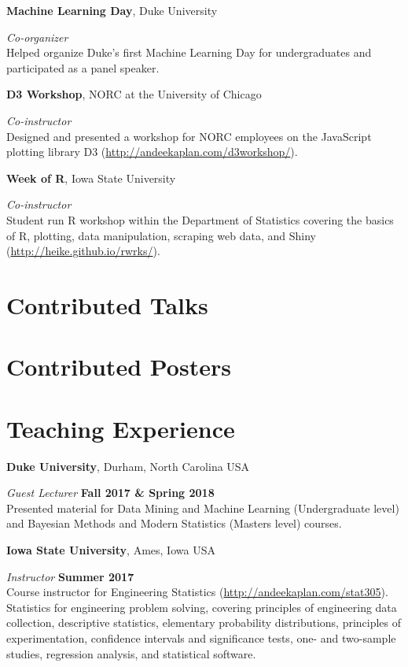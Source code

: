 \documentclass[margin,line]{res}
\begin{document}
\begin{resume}
{\bf Machine Learning Day}, Duke University

\vspace{-.3cm}
{\em Co-organizer} \hfill \\
Helped organize Duke's first Machine Learning Day for undergraduates and participated as a panel speaker.

{\bf D3 Workshop}, NORC at the University of Chicago

\vspace{-.3cm}
{\em Co-instructor} \hfill \\
Designed and presented a workshop for NORC employees on the JavaScript plotting library D3 (\url{http://andeekaplan.com/d3workshop/}).

{\bf Week of R}, Iowa State University

\vspace{-.3cm}
{\em Co-instructor} \hfill \\
Student run R workshop within the Department of Statistics covering the basics of R, plotting, data manipulation, scraping web data, and Shiny (\url{http://heike.github.io/rwrks/}).


\section{\sc Contributed Talks}
\printbibliography[keyword=talk-contributed, heading=none, resetnumbers=true]

\section{\sc Contributed Posters}
\printbibliography[keyword=poster, heading=none, resetnumbers=true]

\section{\sc Teaching Experience}
{\bf Duke University}, Durham, North Carolina USA

{\em Guest Lecturer} \hfill {\bf Fall 2017 \& Spring 2018}\\
Presented material for Data Mining and Machine Learning (Undergraduate level) and Bayesian Methods and Modern Statistics (Masters level) courses.

{\bf Iowa State University}, Ames, Iowa USA

{\em Instructor} \hfill {\bf Summer 2017}\\
Course instructor for Engineering Statistics (\url{http://andeekaplan.com/stat305}). Statistics for engineering problem solving, covering principles of engineering data collection, descriptive statistics, elementary probability distributions, principles of experimentation, confidence intervals and significance tests, one- and two-sample studies, regression analysis, and statistical software.


\end{resume}
\end{document}
